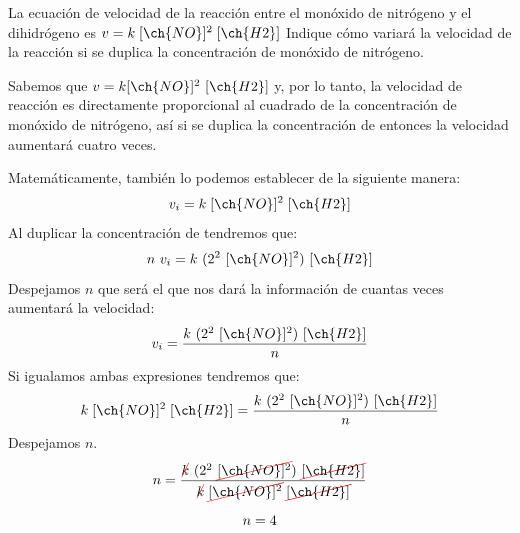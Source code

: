 \begin{exerciseEVAU}
    La ecuación de velocidad de la reacción entre el monóxido de nitrógeno y el dihidrógeno es $v = k\;[\ch{NO}]^2\;[\ch{H2}]$ Indique cómo variará la velocidad de la reacción si se duplica la concentración de monóxido de nitrógeno.
    \begin{solu}

        Sabemos que $v = k[\ch{NO}]^2\ [\ch{H2}]$ y, por lo tanto, la velocidad de reacción es directamente proporcional al cuadrado de la concentración de monóxido de nitrógeno, así si se duplica la concentración de  entonces la velocidad aumentará cuatro veces.

        Matemáticamente, también lo podemos establecer de la siguiente manera:
        \begin{equation*}
            v_i = k\;[\ch{NO}]^2\;[\ch{H2}]
        \end{equation*}
        Al duplicar la concentración de  tendremos que:
        \begin{equation*}
            n\ v_i = k\ (2^2\ [\ch{NO}]^2)\ [\ch{H2}]
        \end{equation*}
        Despejamos $n$ que será el que nos dará la información de cuantas veces aumentará la velocidad:
        \begin{equation*}
            v_i = \dfrac{k\ (2^2\ [\ch{NO}]^2)\ [\ch{H2}]}{n}
        \end{equation*}
        Si igualamos ambas expresiones tendremos que:
        \begin{gather*}
            k\;[\ch{NO}]^2\;[\ch{H2}] = \dfrac{k\ (2^2\ [\ch{NO}]^2)\ [\ch{H2}]}{n}
        \end{gather*}
        Despejamos $n$.
        \begin{gather*}
            n = \dfrac{\cancelred{k}\ (2^2\ \cancelred{[\ch{NO}]^2})\ \cancelred{[\ch{H2}]}}{\cancelred{k}\;\cancelred{[\ch{NO}]^2}\;\cancelred{[\ch{H2}]}}\separ
            n = 4
        \end{gather*}

    \end{solu}
\end{exerciseEVAU}

